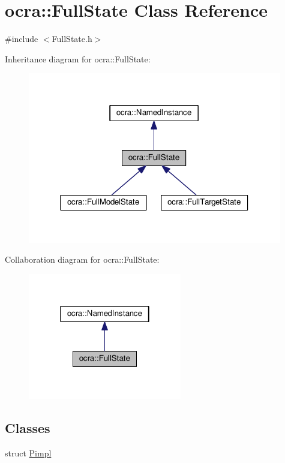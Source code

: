 \hypertarget{classocra_1_1FullState}{}\section{ocra\+:\+:Full\+State Class Reference}
\label{classocra_1_1FullState}


{\ttfamily \#include $<$Full\+State.\+h$>$}



Inheritance diagram for ocra\+:\+:Full\+State\+:
\nopagebreak
\begin{figure}[H]
\begin{center}
\leavevmode
\includegraphics[width=314pt]{d3/d2a/classocra_1_1FullState__inherit__graph}
\end{center}
\end{figure}


Collaboration diagram for ocra\+:\+:Full\+State\+:
\nopagebreak
\begin{figure}[H]
\begin{center}
\leavevmode
\includegraphics[width=190pt]{d2/d7f/classocra_1_1FullState__coll__graph}
\end{center}
\end{figure}
\subsection*{Classes}
\begin{DoxyCompactItemize}
\item 
struct \hyperlink{structocra_1_1FullState_1_1Pimpl}{Pimpl}
\end{DoxyCompactItemize}
